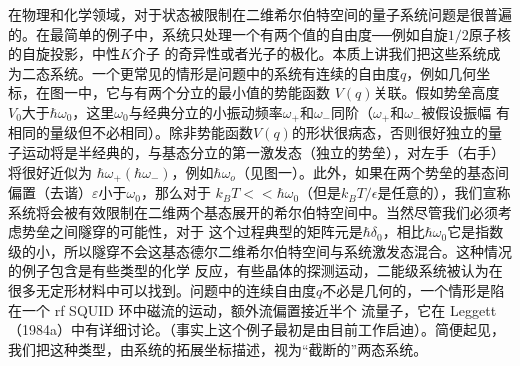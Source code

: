 
在物理和化学领域，对于状态被限制在二维希尔伯特空间的量子系统问题是很普遍的。在最简单的例子中，系统只处理一个有两个值的自由度──例如自旋$1/2$原子核的自旋投影，中性$K$介子
的奇异性或者光子的极化。本质上讲我们把这些系统成为二态系统。一个更常见的情形是问题中的系统有连续的自由度$q$，例如几何坐标，在图一中，它与有两个分立的最小值的势能函数
$V(q)$关联。假如势垒高度$V_0$大于$\hbar\omega_0$，这里$\omega_0$与经典分立的小振动频率$\omega_{+}$和$\omega_{-}$同阶（$\omega_{+}$和$\omega_{-}$被假设振幅
有相同的量级但不必相同）。除非势能函数$V(q)$的形状很病态，否则很好独立的量子运动将是半经典的，与基态分立的第一激发态（独立的势垒），对左手（右手）将很好近似为
$\hbar\omega_{+}(\hbar\omega_{-})$，例如$\hbar\omega_{o}$（见图一）。此外，如果在两个势垒的基态间偏置（去谐）$\varepsilon$小于$\omega_0$，那么对于
$k_BT<<\hbar\omega_0$（但是$k_BT/\epsilon$是任意的），我们宣称系统将会被有效限制在二维两个基态展开的希尔伯特空间中。当然尽管我们必须考虑势垒之间隧穿的可能性，对于
这个过程典型的矩阵元是$\hbar\delta_0$，相比$\hbar\omega_0$它是指数级的小，所以隧穿不会这基态德尔二维希尔伯特空间与系统激发态混合。这种情况的例子包含是有些类型的化学
反应，有些晶体的探测运动，二能级系统被认为在很多无定形材料中可以找到。问题中的连续自由度$q$不必是几何的，一个情形是陷在一个 rf SQUID 环中磁流的运动，额外流偏置接近半个
流量子，它在 Leggett（1984a）中有详细讨论。（事实上这个例子最初是由目前工作启迪）。简便起见，我们把这种类型，由系统的拓展坐标描述，视为“截断的”两态系统。


